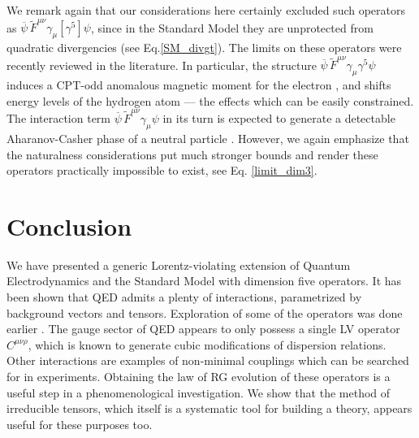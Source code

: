 \documentclass[12pt,preprintnumbers,nofootinbib]{revtex4}
\newcommand{\wt}{\widetilde}
\newcommand{\ov}{\overline}
\begin{document}
	We remark again that our considerations here certainly excluded such 
	operators as $ \ov{\psi}\,\wt{F}^{\mu\nu}\gamma_\mu [\gamma^5] \psi $,
	since in the Standard Model they are unprotected from quadratic divergencies
	(see Eq.\eqref{SM_divgt}).
	The limits on these operators were recently reviewed in the literature.
	In particular, the structure 
	$ \ov{\psi}\,\wt{F}^{\mu\nu}\gamma_\mu \gamma^5 \psi $
	induces a CPT-odd anomalous magnetic moment for the electron 
\cite{Bolokhov:2005cj},
	and shifts energy levels of the 
	hydrogen atom
\cite{Belich:2006pi} ---
	the effects which can be easily constrained.
	The interaction term $ \ov{\psi}\,\wt{F}^{\mu\nu}\gamma_\mu \psi $
	in its turn is expected to generate a detectable 
	Aharanov-Casher phase of a neutral particle 
\cite{Belich:2006tk}.
	However, we again emphasize that the naturalness considerations
	put much stronger bounds and 
	render these operators practically impossible to exist, 
	see Eq. \eqref{limit_dim3}.
	

%
%
\section{Conclusion}
	We have presented a generic Lorentz-violating extension of 
	Quantum Electrodynamics and the Standard Model with dimension five operators.
	It has been shown that QED admits a plenty of interactions,
	parametrized by background vectors and tensors.
	Exploration of some of the operators was done earlier
\cite{MP:,Gagnon:2004xh}.
	The gauge sector of QED appears to only possess a single LV
	operator $ C^{\mu\nu\rho} $, which is known to generate cubic
	modifications of dispersion relations.	
	Other interactions are examples of non-minimal couplings which can
	be searched for in experiments.
	Obtaining the law of RG evolution of these operators is a useful step in a 
	phenomenological investigation.
	We show that the method of irreducible tensors, which itself is a systematic
	tool for building a theory, appears useful for these purposes too.
\end{document}
